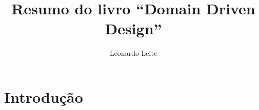 \documentclass[a4paper, 12pt]{article}
\title{Resumo do livro ``Domain Driven Design''}
\author{Leonardo Leite}
\begin{document}
\maketitle

\section{Introdução}
\end{document}
